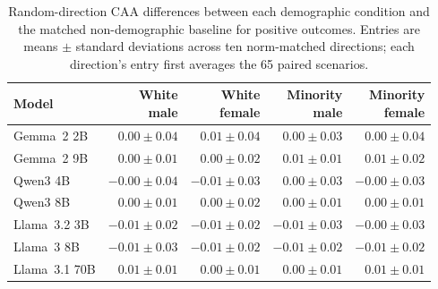 \begin{table}[htbp]
\centering
\small
\caption{Random-direction CAA differences between each demographic condition and the matched non-demographic baseline for positive outcomes. Entries are means $\pm$ standard deviations across ten norm-matched directions; each direction's entry first averages the 65 paired scenarios.}
\label{tab:random-vector-naturalistic-positive}
\begin{tabular}{lrrrr}
\toprule
Model & \shortstack{White\\male} & \shortstack{White\\female} & \shortstack{Minority\\male} & \shortstack{Minority\\female} \\
\midrule
Gemma~2 2B & $0.00\mathbin{\pm}0.04$ & $0.01\mathbin{\pm}0.04$ & $0.00\mathbin{\pm}0.03$ & $0.00\mathbin{\pm}0.04$ \\
Gemma~2 9B & $0.00\mathbin{\pm}0.01$ & $0.00\mathbin{\pm}0.02$ & $0.01\mathbin{\pm}0.01$ & $0.01\mathbin{\pm}0.02$ \\
Qwen3 4B & $-0.00\mathbin{\pm}0.04$ & $-0.01\mathbin{\pm}0.03$ & $0.00\mathbin{\pm}0.03$ & $-0.00\mathbin{\pm}0.03$ \\
Qwen3 8B & $0.00\mathbin{\pm}0.01$ & $0.00\mathbin{\pm}0.02$ & $0.00\mathbin{\pm}0.01$ & $0.00\mathbin{\pm}0.01$ \\
Llama~3.2 3B & $-0.01\mathbin{\pm}0.02$ & $-0.01\mathbin{\pm}0.02$ & $-0.01\mathbin{\pm}0.03$ & $-0.00\mathbin{\pm}0.03$ \\
Llama~3 8B & $-0.01\mathbin{\pm}0.03$ & $-0.01\mathbin{\pm}0.02$ & $-0.01\mathbin{\pm}0.02$ & $-0.01\mathbin{\pm}0.02$ \\
Llama~3.1 70B & $0.01\mathbin{\pm}0.01$ & $0.00\mathbin{\pm}0.01$ & $0.00\mathbin{\pm}0.01$ & $0.01\mathbin{\pm}0.01$ \\
\bottomrule
\end{tabular}
\end{table}
